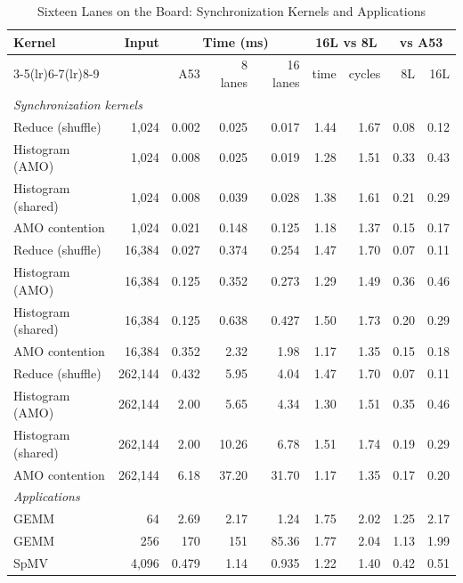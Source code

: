 \begin{table}[p]
\caption{Sixteen Lanes on the Board: Synchronization Kernels and Applications}
\label{tab:lanes16_board_all1}
\centering\footnotesize
\setlength{\tabcolsep}{4pt}
\begin{tabular}{lrrrrrrrr}
\toprule
Kernel & Input & \multicolumn{3}{c}{Time (ms)} & \multicolumn{2}{c}{16L vs 8L} & \multicolumn{2}{c}{vs A53}\\
\cmidrule(lr){3-5}\cmidrule(lr){6-7}\cmidrule(lr){8-9}
 & & A53 & 8 lanes & 16 lanes & time & cycles & 8L & 16L\\
\midrule
\multicolumn{9}{l}{\textit{Synchronization kernels}}\\
Reduce (shuffle) & 1{,}024 & 0.002 & 0.025 & 0.017 & 1.44 & 1.67 & 0.08 & 0.12\\
Histogram (AMO) & 1{,}024 & 0.008 & 0.025 & 0.019 & 1.28 & 1.51 & 0.33 & 0.43\\
Histogram (shared) & 1{,}024 & 0.008 & 0.039 & 0.028 & 1.38 & 1.61 & 0.21 & 0.29\\
AMO contention & 1{,}024 & 0.021 & 0.148 & 0.125 & 1.18 & 1.37 & 0.15 & 0.17\\
Reduce (shuffle) & 16{,}384 & 0.027 & 0.374 & 0.254 & 1.47 & 1.70 & 0.07 & 0.11\\
Histogram (AMO) & 16{,}384 & 0.125 & 0.352 & 0.273 & 1.29 & 1.49 & 0.36 & 0.46\\
Histogram (shared) & 16{,}384 & 0.125 & 0.638 & 0.427 & 1.50 & 1.73 & 0.20 & 0.29\\
AMO contention & 16{,}384 & 0.352 & 2.32 & 1.98 & 1.17 & 1.35 & 0.15 & 0.18\\
Reduce (shuffle) & 262{,}144 & 0.432 & 5.95 & 4.04 & 1.47 & 1.70 & 0.07 & 0.11\\
Histogram (AMO) & 262{,}144 & 2.00 & 5.65 & 4.34 & 1.30 & 1.51 & 0.35 & 0.46\\
Histogram (shared) & 262{,}144 & 2.00 & 10.26 & 6.78 & 1.51 & 1.74 & 0.19 & 0.29\\
AMO contention & 262{,}144 & 6.18 & 37.20 & 31.70 & 1.17 & 1.35 & 0.17 & 0.20\\
\midrule
\multicolumn{9}{l}{\textit{Applications}}\\
GEMM & 64 & 2.69 & 2.17 & 1.24 & 1.75 & 2.02 & 1.25 & 2.17\\
GEMM & 256 & 170 & 151 & 85.36 & 1.77 & 2.04 & 1.13 & 1.99\\
SpMV & 4{,}096 & 0.479 & 1.14 & 0.935 & 1.22 & 1.40 & 0.42 & 0.51\\

\end{tabular}
\end{table}
